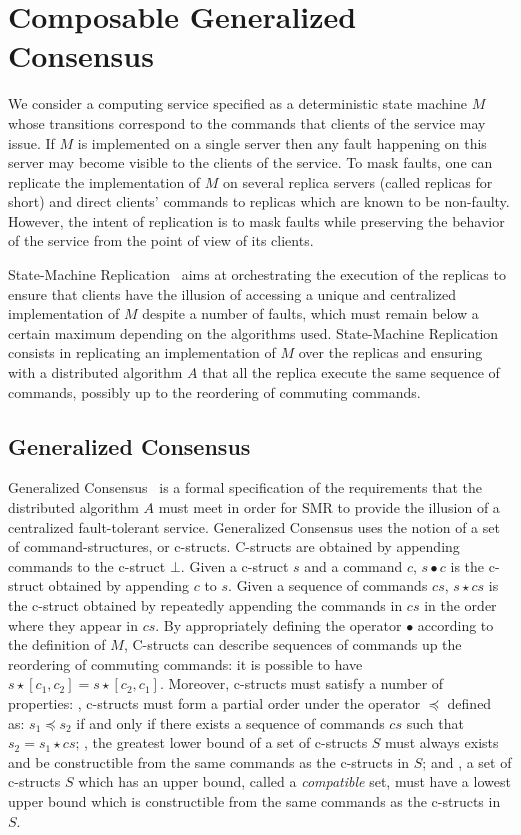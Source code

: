 \section{Composable Generalized Consensus}

We consider a computing service specified as a deterministic state machine $M$ whose transitions correspond to the commands that clients of the service may issue.
If $M$ is implemented on a single server then any fault happening on this server may become visible to the clients of the service.
To mask faults, one can replicate the implementation of $M$ on several replica servers (called replicas for short) and direct clients' commands to replicas which are known to be non-faulty.
However, the intent of replication is to mask faults while preserving the behavior of the service from the point of view of its clients.

State-Machine Replication~\cite{Schneider90ImplementingFaulttolerantServicesUsingStateMachine} aims at orchestrating the execution of the replicas to ensure that clients have the illusion of accessing a unique and centralized implementation of $M$ despite a number of faults, which must remain below a certain maximum depending on the algorithms used.
State-Machine Replication consists in replicating an implementation of $M$ over the replicas and ensuring with a distributed algorithm $A$ that all the replica execute the same sequence of commands, possibly up to the reordering of commuting commands.

\subsection{Generalized Consensus}

Generalized Consensus~\cite{Lamport05GeneralizeConsensus} is a formal specification of the requirements that the distributed algorithm $A$ must meet in order for SMR to provide the illusion of a centralized fault-tolerant service.
Generalized Consensus uses the notion of a set of command-structures, or c-structs. C-structs are obtained by appending commands to the c-struct $\bot$. Given a c-struct $s$ and a command $c$, $s \bullet c$ is the c-struct obtained by appending $c$ to $s$. Given a sequence of commands $cs$, $s\star cs$ is the c-struct obtained by repeatedly appending the commands in $cs$ in the order where they appear in $cs$. By appropriately defining the operator $\bullet$ according to the
definition of $M$, C-structs can describe sequences of commands up the reordering of commuting
commands: it is possible to have $s \star \left[c_1,c_2\right] = s \star \left[c_2,c_1\right]$.
Moreover, c-structs must satisfy a number of properties: , c-structs must form a partial order under the operator $\preceq$ defined as: $s_1 \preceq s_2$ if and only if there exists a sequence of commands $cs$ such that $s_2 = s_1 \star cs$; , the greatest lower bound of a set of c-structs $S$ must always exists and be constructible from the same commands as the c-structs in $S$; and , a set of c-structs $S$
which has an upper bound, called a \emph{compatible} set, must have a lowest upper bound which is constructible from the same commands as the c-structs in $S$. 


